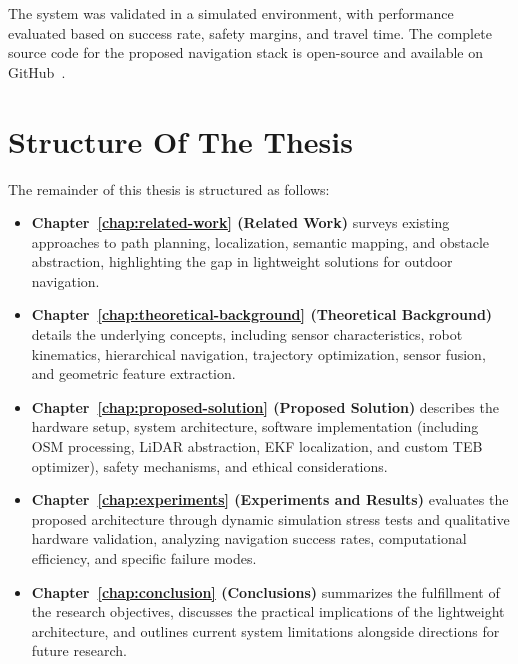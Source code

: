 The system was validated in a simulated environment, with performance evaluated based on success rate, safety margins, and travel time. The complete source code for the proposed navigation stack is open-source and available on GitHub~\cite{husiev2026husky}.

\section{Structure Of The Thesis}
\label{sec:structure}

The remainder of this thesis is structured as follows:

\begin{itemize}
    \item \textbf{Chapter~\ref{chap:related-work} (Related Work)} surveys existing approaches to path planning, localization, semantic mapping, and obstacle abstraction, highlighting the gap in lightweight solutions for outdoor navigation.
    \item \textbf{Chapter~\ref{chap:theoretical-background} (Theoretical Background)} details the underlying concepts, including sensor characteristics, robot kinematics, hierarchical navigation, trajectory optimization, sensor fusion, and geometric feature extraction.
    \item \textbf{Chapter~\ref{chap:proposed-solution} (Proposed Solution)} describes the hardware setup, system architecture, software implementation (including OSM processing, LiDAR abstraction, EKF localization, and custom TEB optimizer), safety mechanisms, and ethical considerations.
    \item \textbf{Chapter~\ref{chap:experiments} (Experiments and Results)} evaluates the proposed architecture through dynamic simulation stress tests and qualitative hardware validation, analyzing navigation success rates, computational efficiency, and specific failure modes.
    \item \textbf{Chapter~\ref{chap:conclusion} (Conclusions)} summarizes the fulfillment of the research objectives, discusses the practical implications of the lightweight architecture, and outlines current system limitations alongside directions for future research.
\end{itemize}

